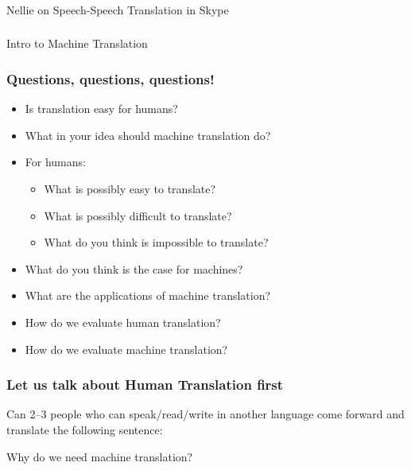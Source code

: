 \documentclass{beamer}
\begin{document}
\begin{frame}
\frametitle{}
Nellie on Speech-Speech Translation in Skype
\end{frame}

\begin{frame}
\frametitle{}
\Large Intro to Machine Translation
\end{frame}

\begin{frame}
\frametitle{Questions, questions, questions!}
\begin{itemize}
\item Is translation easy for humans? \pause
\item What in your idea should machine translation do? \pause
\item For humans:
\begin{itemize}
\item What is possibly easy to translate? \pause
\item What is possibly difficult to translate? \pause
\item What do you think is impossible to translate? \pause
\end{itemize}
\item What do you think is the case for machines? \pause
\item What are the applications of machine translation? \pause
\item How do we evaluate human translation? \pause
\item How do we evaluate machine translation? 
\end{itemize}
\end{frame}

\begin{frame}
\frametitle{Let us talk about Human Translation first}
Can 2--3 people who can speak/read/write in another language come forward and translate the following sentence:

\medskip

Why do we need machine translation? 

\end{frame}
\end{document}
